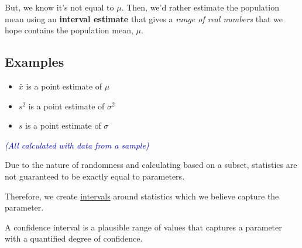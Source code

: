 \vspace{1em}

But, we know it’s not equal to $\mu$. Then, we’d rather estimate the population mean using an \textbf{interval estimate} that gives a \textit{range of real numbers} that we hope contains the population mean, $\mu$.
\vspace{1em}
\textcolor{orange!80!black}{\section*{Examples}}

\begin{itemize}
    \item $\bar{x}$ is a point estimate of $\mu$
    \item $s^2$ is a point estimate of $\sigma^2$
    \item $s$ is a point estimate of $\sigma$
\end{itemize}

\vspace{0.5em}
\textcolor{blue}{\textit{(All calculated with data from a sample)}}

\vspace{1.5em}

Due to the nature of randomness and calculating based on a subset, statistics are not guaranteed to be exactly equal to parameters.

\vspace{1em}

Therefore, we create \underline{intervals} around statistics which we believe capture the parameter.

\vspace{0.5em}

\noindent
\begin{definition}
A confidence interval is a plausible range of values that captures a parameter with a quantified degree of confidence.
\end{definition}



\vspace{1em}

\begin{center}
\end{center}

